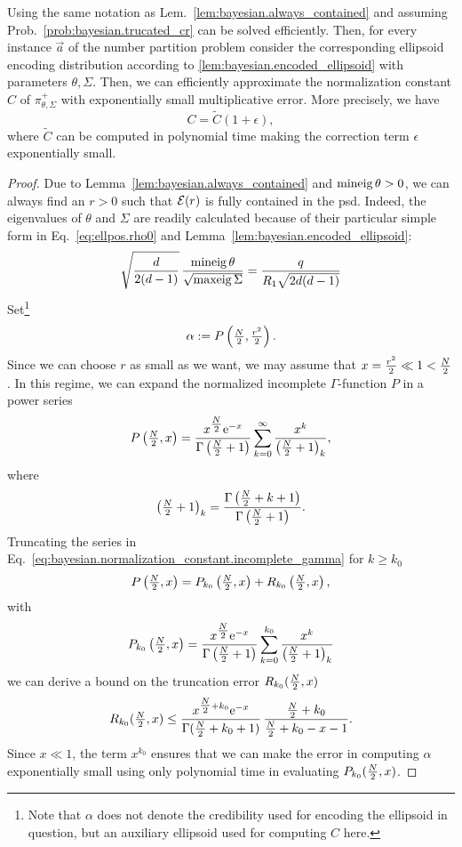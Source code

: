 \begin{lemma}\label{lem:bayesian.normalization_constant}
  Using the same notation as Lem.~\ref{lem:bayesian.always_contained} and assuming Prob.~\ref{prob:bayesian.trucated_cr} can be solved efficiently.
  Then, for every instance $\vec a$ of the number partition problem consider the corresponding ellipsoid encoding distribution according to \cref{lem:bayesian.encoded_ellipsoid} with parameters $\theta, \Sigma$.
  Then, we can efficiently approximate the normalization constant $C$ of $\pi^+_{\theta,\Sigma}$ with exponentially small multiplicative error.
  More precisely, we have
  \[
    C = \tilde C (1 + \epsilon),
  \]
  where $\tilde C$ can be computed in polynomial time making the correction term $\epsilon$ exponentially small.
\end{lemma}
\begin{proof}
  Due to Lemma~\ref{lem:bayesian.always_contained} and $\operatorname{mineig}\theta > 0$, we can always find an $r > 0$ such that $\mathcal{E}(r)$ is fully contained in the psd.
  Indeed, the eigenvalues of $\theta$ and $\Sigma$ are readily calculated because of their particular simple form in Eq.~\eqref{eq:ellpos.rho0} and Lemma~\ref{lem:bayesian.encoded_ellipsoid}:
  \[
    \sqrt{\frac{d}{2(d-1)}} \, \frac{\operatorname{mineig}\theta}{\sqrt{\operatorname{maxeig}\Sigma}}
    =  \frac{q}{R_1 \sqrt{2d(d-1)}}
  \]
  Set\footnote{%
    Note that $\alpha$ does not denote the credibility used for encoding the ellipsoid in question, but an auxiliary ellipsoid used for computing $C$ here.
  }
  \[
    \alpha := P\left( \tfrac{N}{2}, \tfrac{r^2}{2} \right).
  \]
  Since we can choose $r$ as small as we want, we may assume that $x = \frac{r^2}{2} \ll 1 < \tfrac{N}{2}$.
  In this regime, we can expand the normalized incomplete $\Gamma$-function $P$ in a power series~\cite{Gil_2012_Efficient}
  \[
    \label{eq:bayesian.normalization_constant.incomplete_gamma}
    P\left( \tfrac{N}{2}, x \right) = \frac{x^{\tfrac{N}{2}} \mathrm{e}^{-x}}{\Gamma\left( \tfrac{N}{2} + 1 \right)} \sum_{k=0}^\infty \frac{x^k}{{\left( \tfrac{N}{2} + 1 \right)}_k},
  \]
  where
  \[
    {\left( \tfrac{N}{2} + 1 \right)}_k = \frac{\Gamma\left( \tfrac{N}{2} + k + 1 \right)}{\Gamma\left( \tfrac{N}{2} + 1 \right)}.
  \]
  Truncating the series in Eq.~\eqref{eq:bayesian.normalization_constant.incomplete_gamma} for $k \ge k_0$
  \[
    \label{eq:bayesian.normalization_constant.series}
    P\left( \tfrac{N}{2},x \right) = P_{k_0}\left( \tfrac{N}{2},x \right) + R_{k_0}\left( \tfrac{N}{2},x \right),
  \]
  with
  \[
    P_{k_0}\left( \tfrac{N}{2},x \right)
    = \frac{x^{\tfrac{N}{2}} \mathrm{e}^{-x}}{\Gamma\left( \tfrac{N}{2} + 1 \right)} \sum_{k=0}^{k_0} \frac{x^k}{{\left( \tfrac{N}{2} + 1 \right)}_k}
  \]
  we can derive a bound on the truncation error $R_{k_0}(\tfrac{N}{2},x)$~\cite[Eq.~(2.18)]{Gil_2012_Efficient}
  \[
    R_{k_0}(\tfrac{N}{2},x) \le \frac{x^{\tfrac{N}{2} + k_0} \mathrm{e}^{-x}}{\Gamma(\tfrac{N}{2} + k_0 + 1)}\, \frac{\tfrac{N}{2} + k_0}{\tfrac{N}{2} + k_0 - x - 1}.
  \]
  Since $x \ll 1$, the term $x^{k_0}$ ensures that we can make the error in computing $\alpha$ exponentially small using only polynomial time in evaluating $P_{k_0}(\tfrac{N}{2}, x)$.



\end{proof}

